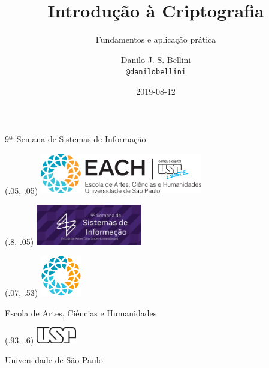 \documentclass[utf8]{beamer}
\title{Introdução à Criptografia}
\subtitle{Fundamentos e aplicação prática}
\author{Danilo J. S. Bellini \\ \texttt{@danilobellini}}
\date{2019-08-12}
\newcommand{\uppera}[0]{\textsuperscript{\b{a}}~}
\begin{document}
\begin{frame} \vspace{2cm}
  \titlepage
  \center
    {\huge 9\uppera Semana de Sistemas de Informação}
  \begin{textblock}{0}(.05, .05)%
    \includegraphics[height=50pt]{logoeach2.png}%
  \end{textblock}
  \begin{textblock}{0}(.8, .05)%
    \includegraphics[height=50pt]{IXSSI-768x294.jpg}%
  \end{textblock}
  \begin{textblock}{.4}(.07, .53)%
    \includegraphics[height=50pt]{Logo_EACH-USP.png}

    Escola de Artes, Ciências e Humanidades%
  \end{textblock}
  \begin{textblock}{.3}(.93, .6)
    \includegraphics[height=20pt]{usp.png}

    Universidade de São Paulo%
  \end{textblock}
\end{frame}
\end{document}
